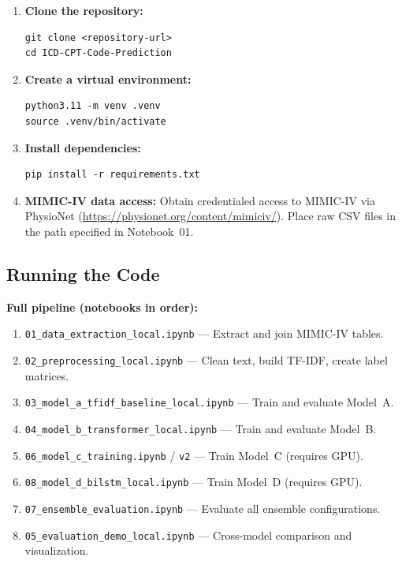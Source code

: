 \documentclass[11pt,a4paper]{article}
\begin{document}
\begin{enumerate}[leftmargin=1.5em]
    \item \textbf{Clone the repository:}
\begin{verbatim}
git clone <repository-url>
cd ICD-CPT-Code-Prediction
\end{verbatim}

    \item \textbf{Create a virtual environment:}
\begin{verbatim}
python3.11 -m venv .venv
source .venv/bin/activate
\end{verbatim}

    \item \textbf{Install dependencies:}
\begin{verbatim}
pip install -r requirements.txt
\end{verbatim}

    \item \textbf{MIMIC-IV data access:} Obtain credentialed access to MIMIC-IV via PhysioNet (\url{https://physionet.org/content/mimiciv/}). Place raw CSV files in the path specified in Notebook~01.
\end{enumerate}

\subsection{Running the Code}

\textbf{Full pipeline (notebooks in order):}
\begin{enumerate}[leftmargin=1.5em]
    \item \texttt{01\_data\_extraction\_local.ipynb} --- Extract and join MIMIC-IV tables.
    \item \texttt{02\_preprocessing\_local.ipynb} --- Clean text, build TF-IDF, create label matrices.
    \item \texttt{03\_model\_a\_tfidf\_baseline\_local.ipynb} --- Train and evaluate Model~A.
    \item \texttt{04\_model\_b\_transformer\_local.ipynb} --- Train and evaluate Model~B.
    \item \texttt{06\_model\_c\_training.ipynb} / \texttt{v2} --- Train Model~C (requires GPU).
    \item \texttt{08\_model\_d\_bilstm\_local.ipynb} --- Train Model~D (requires GPU).
    \item \texttt{07\_ensemble\_evaluation.ipynb} --- Evaluate all ensemble configurations.
    \item \texttt{05\_evaluation\_demo\_local.ipynb} --- Cross-model comparison and visualization.
\end{enumerate}
\end{document}
